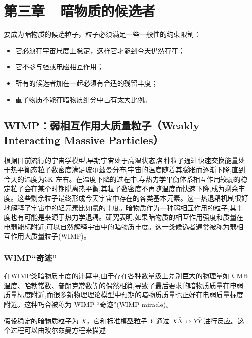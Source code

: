 \section*{第三章~~暗物质的候选者}
\setcounter{section}{3} \setcounter{subsection}{0} 
\setcounter{table}{0} \setcounter{figure}{0} \setcounter{equation}{0}

要成为暗物质的候选粒子，粒子必须满足一些一般性的约束限制：

\begin{itemize}
    \item 它必须在宇宙尺度上稳定，这样它才能到今天仍然存在；
    \item 它不参与强或电磁相互作用；
    \item 所有的候选者加在一起必须有合适的残留丰度；
    \item 重子物质不能在暗物质组分中占有太大比例。
\end{itemize}

\subsection{WIMP：弱相互作用大质量粒子（Weakly Interacting Massive Particles）}

根据目前流行的宇宙学模型,早期宇宙处于高温状态,各种粒子通过快速交换能量处于热平衡态粒子数密度满足玻尔兹曼分布,宇宙的温度随着其膨胀而逐渐下降,直到今天的温度为3K 左右。在温度下降的过程中,与热力学平衡体系相互作用较弱的稳定粒子会在某个时期脱离热平衡,其粒子数密度不再随温度而快速下降,成为剩余丰度。这些剩余粒子最终形成今天宇宙中存在的各类基本元素。这一热退耦机制很好地解释了宇宙中的轻元素比如氦的丰度。暗物质作为一种弱相互作用的粒子,其丰度也有可能是来源于热力学退耦。研究表明,如果暗物质的相互作用强度和质量在电弱能标附近,可以自然解释宇宙中的暗物质丰度。这一类候选者通常被称为弱相互作用大质量粒子(WIMP)。\cite{周宇峰2011暗物质问题简介}

\subsubsection{WIMP“奇迹”}

在WIMP类暗物质丰度的计算中,由于存在各种数量级上差别巨大的物理量如 CMB温度、哈勃常数、普朗克常数等的偶然相消,导致了最后要求的暗物质质量在电弱质量标度附近,而很多新物理理论模型中预期的暗物质质量也正好在电弱质量标度附近。这种巧合被称为 WIMP “奇迹”(WIMP miracle)。\cite{刘佳2009暗物质的理论研究进展}

假设稳定的暗物质粒子为 $X$，它和标准模型粒子 $Y$ 通过 $X\bar{X} \leftrightarrow Y\bar{Y}$ 进行反应。这个过程可以由玻尔兹曼方程来描述

